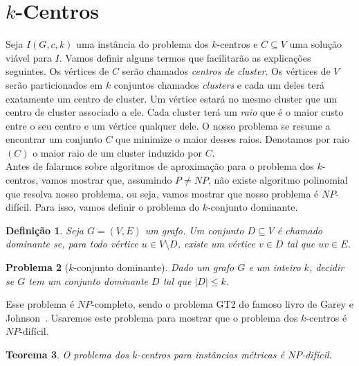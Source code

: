 \documentclass[12pt]{article}
\newtheorem{theorem}{Teorema}[section]
\newtheorem{definition}[theorem]{Definição}
\newtheorem{problem}[theorem]{Problema}
\newcommand{\NP}{\mathit{NP}}
\begin{document}
\newpage
\section{$k$-Centros}

Seja $I(G,c,k)$ uma instância do problema dos $k$-centros e $C \subseteq V$ uma solução viável para $I$. Vamos definir alguns termos que facilitarão as explicações seguintes. Os vértices de $C$ serão chamados \emph{centros de cluster}. Os vértices de $V$ serão particionados em $k$ conjuntos chamados \emph{clusters} e cada um deles terá exatamente um centro de cluster. Um vértice estará no mesmo cluster que um centro de cluster associado a ele. Cada cluster terá um \emph{raio} que é o maior custo entre o seu centro e um vértice qualquer dele. O nosso problema se resume a encontrar um conjunto $C$ que minimize o maior desses raios. Denotamos por raio$(C)$ o maior raio de um cluster induzido por $C$.\\
Antes de falarmos sobre algoritmos de aproximação para o problema dos $k$-centros, vamos mostrar que, assumindo $P\neq\NP$, não existe algoritmo polinomial que resolva nosso problema, ou seja, vamos mostrar que nosso problema é $\NP$-difícil. Para isso, vamos definir o problema do $k$-conjunto dominante.

\begin{definition}
    Seja $G = (V,E)$ um grafo. Um conjunto $D \subseteq V$ é chamado \emph{dominante} se, para todo vértice $u \in V \setminus D$, existe um vértice $v \in D$ tal que $uv \in E$.
\end{definition}

\begin{problem}[$k$-conjunto dominante]
    Dado um grafo $G$ e um inteiro $k$, decidir se $G$ tem um conjunto dominante $D$ tal que $|D| \leq k$.      
\end{problem}
Esse problema é $\NP$-completo, sendo o problema GT2 do famoso livro de Garey e Johnson~\cite{garey1979computers}. Usaremos este problema para mostrar que o problema dos $k$-centros é $\NP$-difícil.

\begin{theorem}\label{theorem:2.3}
    O problema dos $k$-centros para instâncias métricas é $\NP$-difícil.
\end{theorem}
\end{document}
